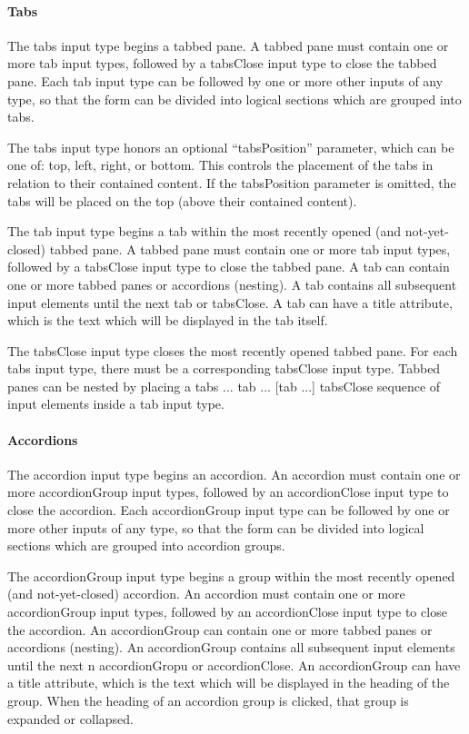 \documentclass[letterpaper,10pt,english]{sphinxmanual}
\begin{document}
\paragraph{Tabs}
\label{jaxFrameworkGuide:tabs}
The tabs input type begins a tabbed pane.  A tabbed pane must contain one or more tab input types,
followed by a tabsClose input type to close the tabbed pane.  Each tab input type can be followed by
one or more other inputs of any type, so that the form can be divided into logical sections which
are grouped into tabs.

The tabs input type honors an optional ``tabsPosition'' parameter, which can be one of: top, left,
right, or bottom.  This controls the placement of the tabs in relation to their contained content.
If the tabsPosition parameter is omitted, the tabs will be placed on the top (above their contained
content).

The tab input type begins a tab within the most recently opened (and not-yet-closed) tabbed pane.  A
tabbed pane must contain one or more tab input types, followed by a tabsClose input type to close
the tabbed pane.  A tab can contain one or more tabbed panes or accordions (nesting).  A tab
contains all subsequent input elements until the next tab or tabsClose.  A tab can have a title
attribute, which is the text which will be displayed in the tab itself.

The tabsClose input type closes the most recently opened tabbed pane.  For each tabs input type,
there must be a corresponding tabsClose input type.  Tabbed panes can be nested by placing a tabs
... tab ... {[}tab ...{]} tabsClose sequence of input elements inside a tab input type.


\paragraph{Accordions}
\label{jaxFrameworkGuide:accordions}
The accordion input type begins an accordion.  An accordion must contain one or more accordionGroup
input types, followed by an accordionClose input type to close the accordion.  Each accordionGroup
input type can be followed by one or more other inputs of any type, so that the form can be divided
into logical sections which are grouped into accordion groups.

The accordionGroup input type begins a group within the most recently opened (and not-yet-closed)
accordion.  An accordion must contain one or more accordionGroup input types, followed by an
accordionClose input type to close the accordion.  An accordionGroup can contain one or more tabbed
panes or accordions (nesting).  An accordionGroup contains all subsequent input elements until the
next n accordionGropu or accordionClose.  An accordionGroup can have a title attribute, which is the
text which will be displayed in the heading of the group.  When the heading of an accordion group is
clicked, that group is expanded or collapsed.
\end{document}

